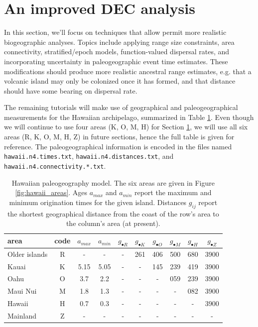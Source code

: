 

\section{An improved DEC analysis} \label{sec:bg_epoch}

In this section, we'll focus on techniques that allow permit more realistic biogeographic analyses.
Topics include applying range size constraints, area connectivity, stratified/epoch models, function-valued dispersal rates, and incorporating uncertainty in paleogeographic event time estimates.
These modifications should produce more realistic ancestral range estimates, e.g. that a volcanic island may only be colonized once it has formed, and that distance should have some bearing on dispersal rate.

The remaining tutorials will make use of geographical and paleogeographical measurements for the Hawaiian archipelago, summarized in Table \ref{tab:paleogeo}.
Even though we will continue to use four areas (K, O, M, H) for Section \ref{sec:bg_epoch}, we will use all six areas (R, K, O, M, H, Z) in future sections, hence the full table is given for reference.
The paleogeographical information is encoded in the files named {\tt hawaii.n4.times.txt}, {\tt hawaii.n4.distances.txt}, and {\tt hawaii.n4.connectivity.*.txt}.

\begin{table}[!h]
\centering
\begin{tabular}{l|c|cc|cccccc}
area & code & $a_{max}$ & $a_{min}$ & $g_{\bullet R}$ & $g_{\bullet K}$ & $g_{\bullet O}$ & $g_{\bullet M}$ & $g_{\bullet H}$  & $g_{\bullet Z}$ \\ \hline
Older islands & R & - & - & - & 261 & 406 & 500 & 680 & 3900 \\
Kauai & K & 5.15 & 5.05 & - & - & 145 & 239 & 419 & 3900 \\
Oahu & O & 3.7  & 2.2  & - & -  & -  & 059 & 239 & 3900 \\
Maui Nui & M & 1.8  & 1.3  & - & -  & -  & -  & 082 & 3900 \\
Hawaii & H & 0.7  & 0.3  & - & -  & -  & -  & - & 3900 \\
Mainland & Z & - & - & - & - & - & - & - & - \\
\end{tabular}
\caption{Hawaiian paleogeography model. The six areas are given in Figure \ref{fig:hawaii_areas}.
Ages $a_{max}$ and $a_{min}$ report the maximum and minimum origination times for the given island.
Distances $g_{ij}$ report the shortest geographical distance from the coast of the row's area to the column's area (at present).}
\label{tab:paleogeo}
\end{table}

